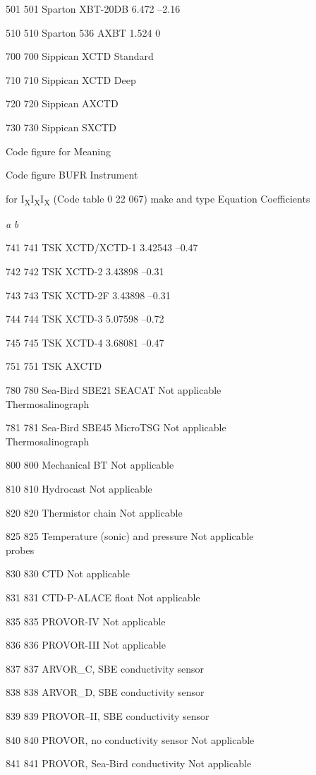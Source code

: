 501 501 Sparton XBT-20DB 6.472 --2.16

510 510 Sparton 536 AXBT 1.524 0

700 700 Sippican XCTD Standard

710 710 Sippican XCTD Deep

720 720 Sippican AXCTD

730 730 Sippican SXCTD

Code figure for Meaning

Code figure BUFR Instrument

for I\textsubscript{X}I\textsubscript{X}I\textsubscript{X} (Code table 0 22 067) make and type Equation Coefficients

\emph{a} \emph{b}

741 741 TSK XCTD/XCTD-1 3.42543 --0.47

742 742 TSK XCTD-2 3.43898 --0.31

743 743 TSK XCTD-2F 3.43898 --0.31

744 744 TSK XCTD-3 5.07598 --0.72

745 745 TSK XCTD-4 3.68081 --0.47

751 751 TSK AXCTD

780 780 Sea-Bird SBE21 SEACAT Not applicable\\
Thermosalinograph

781 781 Sea-Bird SBE45 MicroTSG Not applicable\\
Thermosalinograph

800 800 Mechanical BT Not applicable

810 810 Hydrocast Not applicable

820 820 Thermistor chain Not applicable

825 825 Temperature (sonic) and pressure Not applicable\\
probes

830 830 CTD Not applicable

831 831 CTD-P-ALACE float Not applicable

835 835 PROVOR-IV Not applicable

836 836 PROVOR-III Not applicable

837 837 ARVOR\_C, SBE conductivity sensor

838 838 ARVOR\_D, SBE conductivity sensor

839 839 PROVOR--II, SBE conductivity sensor

840 840 PROVOR, no conductivity sensor Not applicable

841 841 PROVOR, Sea-Bird conductivity Not applicable

